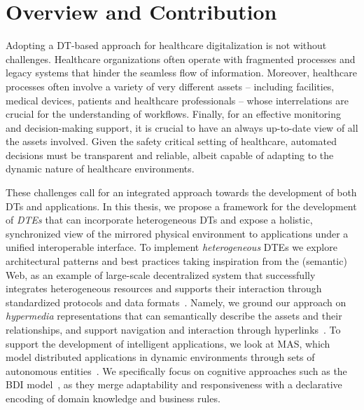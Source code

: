 \section*{Overview and Contribution}

Adopting a \ac{DT}-based approach for healthcare digitalization is not without challenges.
%
Healthcare organizations often operate with fragmented processes and legacy systems that hinder the seamless flow of information.
%
Moreover, healthcare processes often involve a variety of very different assets
-- including facilities, medical devices, patients and healthcare professionals --
whose interrelations are crucial for the understanding of workflows.
%
Finally, for an effective monitoring and decision-making support, it is crucial to have an always up-to-date view of all the assets involved.
%
Given the safety critical setting of healthcare, automated decisions must be transparent and reliable, albeit capable of adapting to the dynamic nature of healthcare environments.


These challenges call for an integrated approach towards the development of both \acp{DT} and applications.
%
In this thesis, we propose a framework for the development of \emph{\acp{DTE}} that can incorporate heterogeneous \acp{DT} and expose a holistic, synchronized view of the mirrored physical environment to applications under a unified interoperable interface.
%
To implement \emph{heterogeneous} \acp{DTE} we explore architectural patterns and best practices taking inspiration from the (semantic) Web, as an example of large-scale decentralized system that successfully integrates heterogeneous resources and supports their interaction through standardized protocols and data formats~\cite{Shadbolt_Berners-Lee_Hall_2006}.
%
Namely, we ground our approach on \emph{hypermedia} representations that can semantically describe the assets and their relationships, and support navigation and interaction through hyperlinks~\cite{fielding2000architectural}.
%
To support the development of intelligent applications, we look at \ac{MAS}, which model distributed applications in dynamic environments through sets of autonomous entities~\cite{2009wooldridge}.
We specifically focus on cognitive approaches such as the \ac{BDI} model~\cite{Bratman1987-BRAIPA,rao1991modeling}, as they merge adaptability and responsiveness with a declarative encoding of domain knowledge and business rules.

